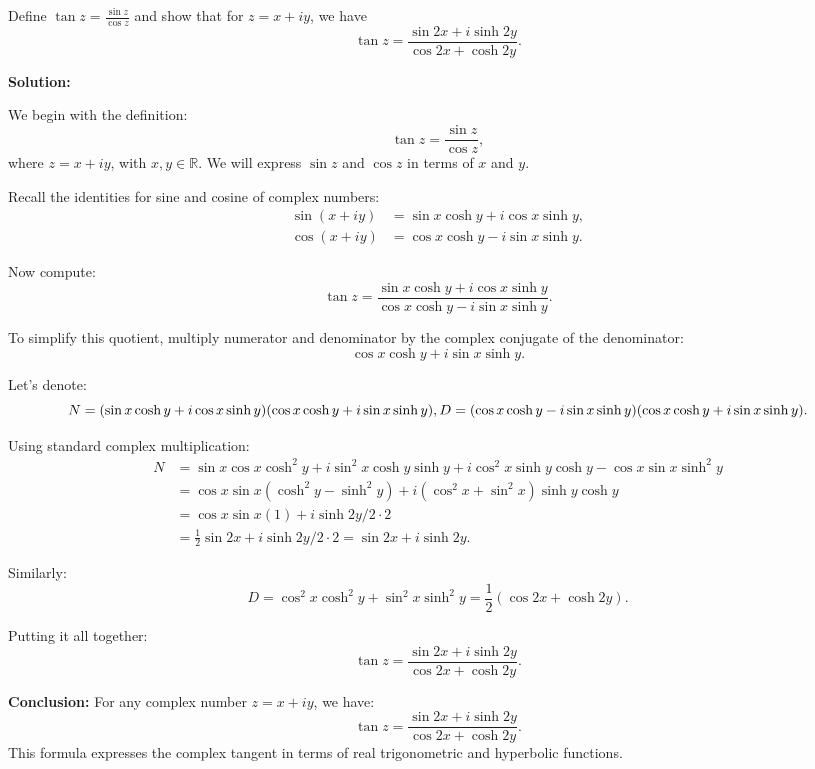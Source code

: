 \begin{problembox}
Define \( \tan z = \frac{\sin z}{\cos z} \) and show that for \( z = x + iy \), we have
\[
\tan z = \frac{\sin 2x + i \sinh 2y}{\cos 2x + \cosh 2y}.
\]
\end{problembox}

\textbf{Solution:}

We begin with the definition:
\[
\tan z = \frac{\sin z}{\cos z},
\]
where \( z = x + iy \), with \( x, y \in \mathbb{R} \). We will express \( \sin z \) and \( \cos z \) in terms of \( x \) and \( y \).

Recall the identities for sine and cosine of complex numbers:
\begin{align*}
\sin(x + iy) &= \sin x \cosh y + i \cos x \sinh y, \\
\cos(x + iy) &= \cos x \cosh y - i \sin x \sinh y.
\end{align*}

Now compute:
\[
\tan z = \frac{\sin x \cosh y + i \cos x \sinh y}{\cos x \cosh y - i \sin x \sinh y}.
\]

To simplify this quotient, multiply numerator and denominator by the complex conjugate of the denominator:
\[
\cos x \cosh y + i \sin x \sinh y.
\]

Let’s denote:
\[
N = (\sin x \cosh y + i \cos x \sinh y)(\cos x \cosh y + i \sin x \sinh y), \\
D = (\cos x \cosh y - i \sin x \sinh y)(\cos x \cosh y + i \sin x \sinh y).
\]

Using standard complex multiplication:
\begin{align*}
N &= \sin x \cos x \cosh^2 y + i \sin^2 x \cosh y \sinh y + i \cos^2 x \sinh y \cosh y - \cos x \sin x \sinh^2 y \\
&= \cos x \sin x (\cosh^2 y - \sinh^2 y) + i (\cos^2 x + \sin^2 x)\sinh y \cosh y \\
&= \cos x \sin x (1) + i \sinh 2y / 2 \cdot 2 \\
&= \frac{1}{2} \sin 2x + i \sinh 2y / 2 \cdot 2 = \sin 2x + i \sinh 2y.
\end{align*}

Similarly:
\[
D = \cos^2 x \cosh^2 y + \sin^2 x \sinh^2 y = \frac{1}{2}(\cos 2x + \cosh 2y).
\]

Putting it all together:
\[
\tan z = \frac{\sin 2x + i \sinh 2y}{\cos 2x + \cosh 2y}.
\]

\textbf{Conclusion:}  
For any complex number \( z = x + iy \), we have:
\[
\tan z = \frac{\sin 2x + i \sinh 2y}{\cos 2x + \cosh 2y}.
\]
This formula expresses the complex tangent in terms of real trigonometric and hyperbolic functions.


